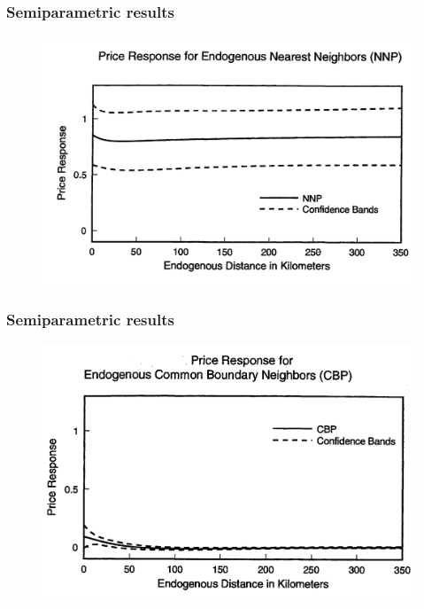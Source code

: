 \documentclass{beamer}
\begin{document}
\begin{frame}
  \frametitle{Semiparametric results}
  \vspace{-0.6cm}
  \begin{figure}
    \includegraphics[width=\linewidth]{NNP.png}
  \end{figure}
\end{frame}

\begin{frame}
  \frametitle{Semiparametric results}
  \vspace{-0.6cm}
  \begin{figure}
    \includegraphics[width=\linewidth]{CBP.png}
  \end{figure}
\end{frame}
\end{document}
